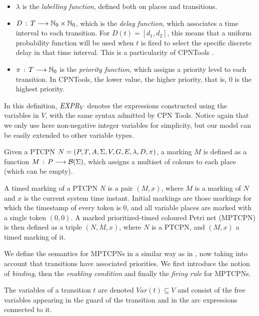 \begin{definition} 
\begin{itemize}
\item $\lambda$ is the {\em labelling function}, defined
both on places and transitions.

\item $D\,:\,T \longrightarrow \mathbb{N}_{0} \times \mathbb{N}_{0}$, which
is the {\em delay function}, which associates a time
interval to each transition. For $D(t)=[d_1,d_2]$,
this means that a uniform probability function will
be used when $t$ is fired to select the specific discrete
delay in that time interval. This is a particularity of CPNTools \cite{CPNTools}.
%
\item $\pi\,:\,T \longrightarrow \mathbb{N}_{0}$ is the
{\em priority function}, which assigns a priority level
to each transition. In CPNTools, the lower value, the higher priority, that is, $0$ is the highest priority.
\end{itemize}

In this definition, ${\it EXPR}_V$ denotes the
expressions constructed using the variables in $V$,
with the same syntax admitted by CPN Tools. Notice again that we only use here non-negative integer variables for simplicity, but
our model can be easily extended to other variable types.
\end{definition}

\begin{definition} [(Markings)]
Given a PTCPN $N=(P,T,A,\Sigma,V,G,E,\lambda,D,\pi)$,
a marking $M$ is defined as a function
$M\,:\,P \longrightarrow {\cal B}(\Sigma)$,
which assigns a multiset of colours to each place
(which can be empty). 

A timed marking of a PTCPN $N$ is a pair $(M,x)$, where
$M$ is a marking of $N$ and $x$ is the current system time instant.
%
%
Initial markings are those markings for which
the timestamp of every token is $0$,
and all variable places are marked with a single
token $(0,0)$.
A marked prioritized-timed coloured Petri net (MPTCPN)
is then defined as a triple $(N,M,x)$, where
$N$ is a PTCPN, and $(M,x)$ a timed marking of it.
%
\end{definition}

We define the semantics for MPTCPNs in a similar way as in \cite{Jensen2009}, 
now taking into account that transitions have associated priorities.
We first introduce the notion of {\em binding}, then
the {\em enabling condition} and finally the {\em firing rule}
for MPTCPNs.

The variables of a transition $t$ are denoted $\mathit{Var(t)\subseteq V}$ and consist of the free variables
appearing in the guard of the transition and in the arc expressions connected to it.

